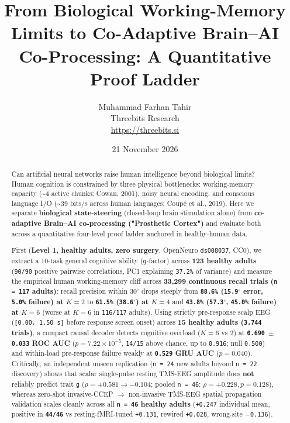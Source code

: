 \documentclass[11pt,a4paper]{article}
\title{From Biological Working-Memory Limits to Co-Adaptive Brain--AI Co-Processing: A Quantitative Proof Ladder}
\author{Muhammad Farhan Tahir\\Threebits Research\\\url{https://threebits.si}}
\date{21 November 2026}
\begin{document}
\maketitle

\begin{abstract}
Can artificial neural networks raise human intelligence beyond biological limits? Human cognition is constrained by three physical bottlenecks: working-memory capacity (\textasciitilde{}4 active chunks; Cowan, 2001), noisy neural encoding, and conscious language I/O (\textasciitilde{}39 bits/s across human languages; Coupé et al., 2019). Here we separate \textbf{biological state-steering} (closed-loop brain stimulation alone) from \textbf{co-adaptive Brain--AI co-processing ("Prosthetic Cortex")} and evaluate both across a quantitative four-level proof ladder anchored in healthy-human data.

First (\textbf{Level 1, healthy adults, zero surgery}, OpenNeuro \texttt{ds008037}, CC0), we extract a 10-task general cognitive ability (\texttt{g}-factor) across \textbf{123 healthy adults} (\texttt{90/90} positive pairwise correlations, PC1 explaining \texttt{37.2\%} of variance) and measure the empirical human working-memory cliff across \textbf{33,299 continuous recall trials (\texttt{n = 117} adults)}: recall precision within $30^\circ$ drops steeply from \textbf{\texttt{88.6\%} (\texttt{15.9$^\circ$} error, \texttt{5.0\%} failure) at $K = 2$} to \textbf{\texttt{61.5\%} (\texttt{38.6$^\circ$}) at $K = 4$} and \textbf{\texttt{43.8\%} (\texttt{57.3$^\circ$}, \texttt{45.0\%} failure) at $K = 6$} (worse at $K = 6$ in \texttt{116/117} adults). Using strictly pre-response scalp EEG (\texttt{[0.00, 1.50 s]} before response screen onset) across \textbf{15 healthy adults (\texttt{3,744} trials)}, a compact causal decoder detects cognitive overload ($K = 6$ vs $2$) at \textbf{\texttt{0.690 $\pm$ 0.033} ROC AUC} ($p = 7.22 \times 10^{-5}$, \texttt{14/15} above chance, up to \texttt{0.916}; null \texttt{0.500}) and within-load pre-response failure weakly at \textbf{\texttt{0.529} GRU AUC} ($p = 0.040$). Critically, an independent unseen replication (\texttt{n = 24} new adults beyond \texttt{n = 22} discovery) shows that scalar single-pulse resting TMS-EEG amplitude does \textbf{not} reliably predict trait \texttt{g} ($\rho = +0.581 \to -0.104$; pooled \texttt{n = 46}: $\rho = +0.228, p = 0.128$), whereas zero-shot invasive-CCEP $\to$ non-invasive TMS-EEG spatial propagation validation scales cleanly across all \textbf{\texttt{n = 46} healthy adults} (\texttt{+0.247} individual mean, positive in \textbf{\texttt{44/46}} vs resting-fMRI-tuned \texttt{+0.131}, rewired \texttt{+0.028}, wrong-site \texttt{$-$0.136}).


\end{abstract}
\end{document}
